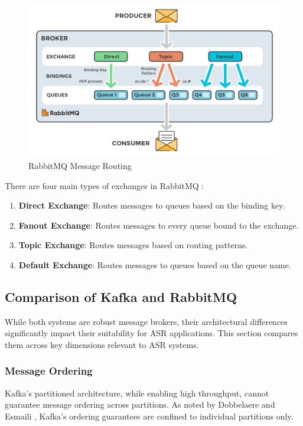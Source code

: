 \begin{figure}[H]
    \centering
    \includegraphics[width=\textwidth]{figures/exchanges-topic-fanout-direct.png}
    \caption{RabbitMQ Message Routing \cite{rabbitmq_diagram}}
    \label{fig:rabbitmq_routing}
\end{figure}

There are four main types of exchanges in RabbitMQ \cite{rabbitmq_exchanges}:
\begin{enumerate}
    \item \textbf{Direct Exchange}: Routes messages to queues based on the binding key.
    \item \textbf{Fanout Exchange}: Routes messages to every queue bound to the exchange.
    \item \textbf{Topic Exchange}: Routes messages based on routing patterns.
    \item \textbf{Default Exchange}: Routes messages to queues based on the queue name.
\end{enumerate}

\subsection{Comparison of Kafka and RabbitMQ}
While both systems are robust message brokers, their architectural differences significantly impact their suitability for ASR applications. This section compares them across key dimensions relevant to ASR systems.

\subsubsection{Message Ordering}
Kafka's partitioned architecture, while enabling high throughput, cannot guarantee message ordering across partitions. As noted by Dobbelaere and Esmaili \cite{kafka_v_rabbitmq}, Kafka's ordering guarantees are confined to individual partitions only.

